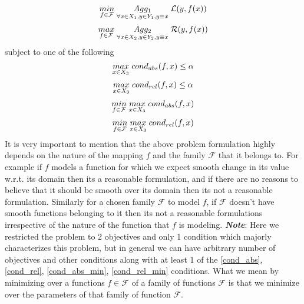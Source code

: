 \begin{equation} \label{opt_loss}
\underset{f\in \mathcal{F}}{min}\hspace{1mm} \underset{\forall x\in X_1, y \in Y_1, y \equiv x}{Agg_1} \hspace{1mm} \mathcal{L}(y,f(x))
\end{equation}
\begin{equation} \label{opt_reward}
\underset{f\in \mathcal{F}}{max}\hspace{1mm} \underset{\forall x\in X_2, y \in Y_2, y \equiv x}{Agg_2} \hspace{1mm} \mathcal{R}(y,f(x))
\end{equation}
subject to one of the following
\begin{equation} \label{cond_abs}
\underset{x \in X_3}{max}\hspace{1mm}cond_{abs}(f,x) \le \alpha 
\end{equation}
\begin{equation} \label{cond_rel}
\underset{x \in X_3}{max}\hspace{1mm} cond_{rel}(f,x) \le \alpha 
\end{equation}
\begin{equation} \label{cond_abs_min}
\underset{f\in \mathcal{F}}{min}\hspace{1mm}\underset{x \in X_3}{max}\hspace{1mm} cond_{abs}(f,x)
\end{equation}
\begin{equation} \label{cond_rel_min}
\underset{f\in \mathcal{F}}{min}\hspace{1mm} \underset{x \in X_3}{max}\hspace{1mm}cond_{rel}(f,x)
\end{equation}
\newline It is very important to mention that the above problem formulation highly depends on the nature of the mapping $f$ and the family $\mathcal{F}$ that it belongs to. For example if $f$ models a function for which we expect smooth change in its value w.r.t. its domain then its a reasonable formulation, and if there are no reasons to believe that it should be smooth over its domain then its not a reasonable formulation. Similarly for a chosen family $\mathcal{F}$ to model $f$, if $\mathcal{F}$ doesn't have smooth functions belonging to it then its not a reasonable formulations irrespective of the nature of the function that $f$ is modeling.
\newline\newline
\textbf{\textit{Note}}: Here we restricted the problem to 2 objectives and only 1 condition which majorly characterizes this problem, but in general we can have arbitrary number of objectives and other conditions along with at least 1 of the \ref{cond_abs}, \ref{cond_rel}, \ref{cond_abs_min}, \ref{cond_rel_min} conditions.\newline
What we mean by minimizing over a functions $f \in \mathcal{F}$ of a family of functions $\mathcal{F}$ is that we minimize over the parameters of that family of function $\mathcal{F}$.

